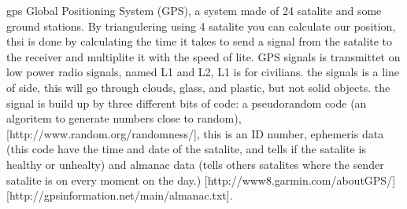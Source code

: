 gps
Global Positioning System (GPS), a system made of 24 satalite and some ground stations. By triangulering using 4 satalite you can calculate our position, thsi is done by calculating the time it takes to send a signal from the satalite  to  the receiver and multiplite it with the speed of lite. GPS signals is transmittet on low power radio signals, named L1 and L2, L1 is for civilians. the signals is a line of side, this will go through clouds, glass, and plastic, but not solid objects. the signal is build up by three different bits of code: a pseudorandom code (an algoritem to generate numbers close to random), [http://www.random.org/randomness/], this is an ID number, ephemeris data (this code have the time and date of the satalite, and tells if the satalite  is healthy or unhealty) and almanac data (tells others satalites where the sender satalite is on every moment on the day.) [http://www8.garmin.com/aboutGPS/] [http://gpsinformation.net/main/almanac.txt].  